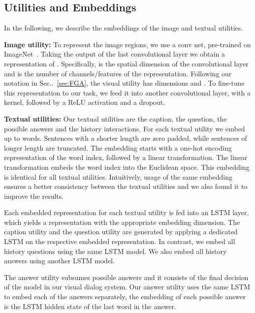 \documentclass[10pt,twocolumn,letterpaper]{article}
\makeatletter
\def\@onedot{\ifx\@let@token.\else.\null\fi\xspace}
\DeclareRobustCommand\onedot{\futurelet\@let@token\@onedot}
\newcommand{\secref}[1]{Sec\onedot~\ref{#1}}
\makeatother
\begin{document}
	\subsection{Utilities and Embeddings}
	\label{sec:modals}
	
	 In the following, we describe the embeddings of the image and textual utilities. 
	
	\noindent\textbf{Image utility:} 
	To represent the image regions, we use a  conv net,  pre-trained on ImageNet~\cite{imagenet_cvpr09}. Taking the output of the last convolutional layer we obtain a representation  of . Specifically,  is the spatial dimension of the convolutional layer and  is the number of channels/features of the representation. Following our notation in  \secref{sec:FGA}, the visual utility  has  dimensions  and . To fine-tune this representation to our task, we feed it into another convolutional layer, with a  kernel, followed by a ReLU activation and a dropout.  


	\noindent\textbf{Textual utilities:} 
	Our textual utilities are the caption, the question, the possible answers and the history interactions. For each textual utility  we embed up to  words. Sentences with a shorter length are zero padded, while sentences of longer length are truncated. The embedding starts with a one-hot encoding representation of the word index, followed by a linear transformation. The linear transformation embeds the word index into the Euclidean space. This embedding is identical for all  textual utilities. Intuitively, usage of the same embedding ensures a better consistency between the textual utilities and we also found it to improve the results. 
	
	Each  embedded representation for each textual utility is fed into an LSTM layer, 
	which yields a representation with the appropriate embedding dimension. The caption utility  and the question utility  are generated by applying a dedicated LSTM on the respective embedded representation. In contrast, we embed all history questions  using the same LSTM model. We also embed all history answers  using another LSTM model. 
	
	The answer utility subsumes  possible answers and it consists of the final decision of the model in our visual dialog system. Our answer utility uses the same LSTM to embed each of the  answers separately, the embedding of each possible answer is the LSTM hidden state of the last word in the answer. 
	
	
\end{document}
